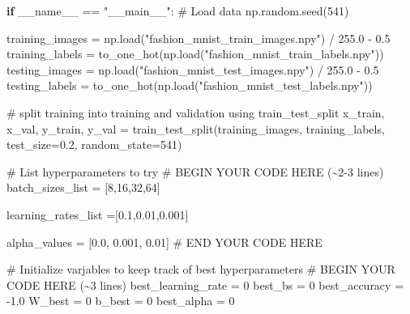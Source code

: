 \documentclass[
  letterpaper,
  DIV=11,
  numbers=noendperiod]{scrartcl}
\newenvironment{Shaded}{\begin{snugshade}}{\end{snugshade}}
\newcommand{\CommentTok}[1]{\textcolor[rgb]{0.37,0.37,0.37}{#1}}
\newcommand{\ControlFlowTok}[1]{\textcolor[rgb]{0.00,0.23,0.31}{\textbf{#1}}}
\newcommand{\DecValTok}[1]{\textcolor[rgb]{0.68,0.00,0.00}{#1}}
\newcommand{\FloatTok}[1]{\textcolor[rgb]{0.68,0.00,0.00}{#1}}
\newcommand{\NormalTok}[1]{\textcolor[rgb]{0.00,0.23,0.31}{#1}}
\newcommand{\OperatorTok}[1]{\textcolor[rgb]{0.37,0.37,0.37}{#1}}
\newcommand{\RegionMarkerTok}[1]{\textcolor[rgb]{0.00,0.23,0.31}{#1}}
\newcommand{\StringTok}[1]{\textcolor[rgb]{0.13,0.47,0.30}{#1}}
\newcommand{\VariableTok}[1]{\textcolor[rgb]{0.07,0.07,0.07}{#1}}
\begin{document}
\begin{Shaded}
\begin{Highlighting}[]
\ControlFlowTok{if} \VariableTok{\_\_name\_\_} \OperatorTok{==} \StringTok{"\_\_main\_\_"}\NormalTok{:}
    \CommentTok{\# Load data}
\NormalTok{    np.random.seed(}\DecValTok{541}\NormalTok{) }
    
\NormalTok{    training\_images }\OperatorTok{=}\NormalTok{ np.load(}\StringTok{"fashion\_mnist\_train\_images.npy"}\NormalTok{) }\OperatorTok{/} \FloatTok{255.0} \OperatorTok{{-}} \FloatTok{0.5}
\NormalTok{    training\_labels }\OperatorTok{=}\NormalTok{ to\_one\_hot(np.load(}\StringTok{"fashion\_mnist\_train\_labels.npy"}\NormalTok{))}
\NormalTok{    testing\_images }\OperatorTok{=}\NormalTok{ np.load(}\StringTok{"fashion\_mnist\_test\_images.npy"}\NormalTok{) }\OperatorTok{/} \FloatTok{255.0} \OperatorTok{{-}} \FloatTok{0.5}
\NormalTok{    testing\_labels }\OperatorTok{=}\NormalTok{ to\_one\_hot(np.load(}\StringTok{"fashion\_mnist\_test\_labels.npy"}\NormalTok{))}

    \CommentTok{\# split training into training and validation using train\_test\_split}
\NormalTok{    x\_train, x\_val, y\_train, y\_val }\OperatorTok{=}\NormalTok{ train\_test\_split(training\_images, training\_labels, test\_size}\OperatorTok{=}\FloatTok{0.2}\NormalTok{, random\_state}\OperatorTok{=}\DecValTok{541}\NormalTok{)}

    \CommentTok{\# List hyperparameters to try}
    \CommentTok{\# }\RegionMarkerTok{BEGIN}\CommentTok{ YOUR CODE HERE (\textasciitilde{}2{-}3 lines)}
\NormalTok{    batch\_sizes\_list }\OperatorTok{=}\NormalTok{ [}\DecValTok{8}\NormalTok{,}\DecValTok{16}\NormalTok{,}\DecValTok{32}\NormalTok{,}\DecValTok{64}\NormalTok{]}

\NormalTok{    learning\_rates\_list }\OperatorTok{=}\NormalTok{[}\FloatTok{0.1}\NormalTok{,}\FloatTok{0.01}\NormalTok{,}\FloatTok{0.001}\NormalTok{]}

\NormalTok{    alpha\_values }\OperatorTok{=}\NormalTok{ [}\FloatTok{0.0}\NormalTok{, }\FloatTok{0.001}\NormalTok{, }\FloatTok{0.01}\NormalTok{]}
    \CommentTok{\# }\RegionMarkerTok{END}\CommentTok{ YOUR CODE HERE}

    \CommentTok{\# Initialize varjables to keep track of best hyperparameters}
    \CommentTok{\# }\RegionMarkerTok{BEGIN}\CommentTok{ YOUR CODE HERE (\textasciitilde{}3 lines)}
\NormalTok{    best\_learning\_rate }\OperatorTok{=} \DecValTok{0}
\NormalTok{    best\_bs }\OperatorTok{=} \DecValTok{0}
\NormalTok{    best\_accuracy }\OperatorTok{=} \OperatorTok{{-}}\FloatTok{1.0} 
\NormalTok{    W\_best }\OperatorTok{=} \DecValTok{0}
\NormalTok{    b\_best }\OperatorTok{=} \DecValTok{0}
\NormalTok{    best\_alpha }\OperatorTok{=} \DecValTok{0}



\end{Highlighting}
\end{Shaded}
\end{document}
